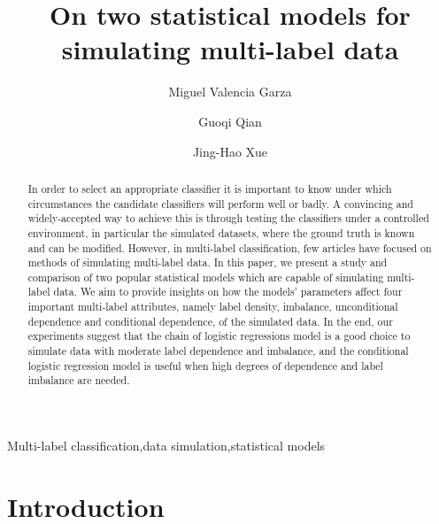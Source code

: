 \documentclass[review]{elsarticle}
\begin{document}
\begin{frontmatter}

\title{On two statistical models for simulating multi-label data}

\author[UCL]{Miguel Valencia Garza}
\author[MEL]{Guoqi Qian}
\author[UCL]{Jing-Hao Xue}
\address[UCL]{Department of Statistical Science, University College London, London WC1E 6BT, UK}
\address[MEL]{School of Mathematics and Statistics, The University of Melbourne, Parkville VIC 3010, Australia}

\begin{abstract}
In order to select an appropriate classifier it is important to know under which circumstances the candidate classifiers will perform well or badly. A convincing and widely-accepted way to achieve this is through testing the classifiers under a controlled environment, in particular the simulated datasets, where the ground truth is known and can be modified. However, in multi-label classification, few articles have focused on methods of simulating multi-label data. In this paper, we present a study and comparison of two popular statistical models which are capable of simulating multi-label data. We aim to provide insights on how the models' parameters affect four important multi-label attributes, namely label density, imbalance, unconditional dependence and conditional dependence, of the simulated data. In the end, our experiments suggest that the chain of logistic regressions model is a good choice to simulate data with moderate label dependence and imbalance, and the conditional logistic regression model is useful when high degrees of dependence and label imbalance are needed. 
\end{abstract}

\begin{keyword}
Multi-label classification\sep data simulation\sep statistical models
\end{keyword}

\end{frontmatter}

\linenumbers


\section{Introduction}
\label{INTRO}
\end{document}

